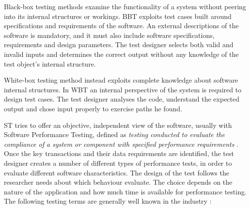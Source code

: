 Black-box testing  methods  examine the functionality of a system without peering into its internal structures or workings. BBT exploits test cases built around specifications and requirements of the software. An external descriptions of the software is mandatory, and it must also include software specifications, requirements and design parameters.  The test designer selects both valid and invalid inputs and determines the correct output without any knowledge of the test object's internal structure.

White-box testing  method instead exploits complete knowledge about software internal structures. In WBT an internal perspective of the system is required to design test cases. The test designer analyses the code, understand the expected output and chose input properly  to exercise paths he found. 

ST tries to offer an objective, independent view of the software, usually with Software Performance Testing, defined as  \textit{testing conducted to evaluate the compliance of a system or component with specified performance requirements} \cite{IEEEStd610.12-1990:glossary}. Once  the key transactions and their data requirements are identified, the test designer creates a number of different types of performance tests, in order to evaluate different software characteristics. The design of the test follows the researcher needs about which behaviour evaluate. The choice depends on the nature of the application and how much time is available for performance testing. The following testing terms are generally well known in the industry \cite{Molyneaux:2009:AAP:1550832}:


